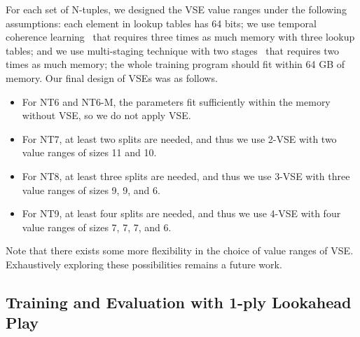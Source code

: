 For each set of N-tuples, we designed the VSE value ranges under the following assumptions: each element in lookup tables has 64 bits; we use temporal coherence learning~\cite{Jask18} that requires three times as much memory with three lookup tables; and we use multi-staging technique with two stages~\cite{GuCW22} that requires two times as much memory; the whole training program should fit within 64 GB of memory.
Our final design of VSEs was as follows.
\begin{itemize}
\item For \textsf{NT6} and \textsf{NT6-M}, the parameters fit sufficiently within the memory without VSE, so we do not apply VSE.
\item For \textsf{NT7}, at least two splits are needed, and thus we use 2-VSE with two value ranges of sizes 11 and 10.
\item For \textsf{NT8}, at least three splits are needed, and thus we use 3-VSE with three value ranges of sizes 9, 9, and 6.
\item For \textsf{NT9}, at least four splits are needed, and thus we use 4-VSE with four value ranges of sizes 7, 7, 7, and 6.
\end{itemize}

Note that there exists some more flexibility in the choice of value ranges of VSE.
Exhaustively exploring these possibilities remains a future work.

\subsection{Training and Evaluation with 1-ply Lookahead Play}

